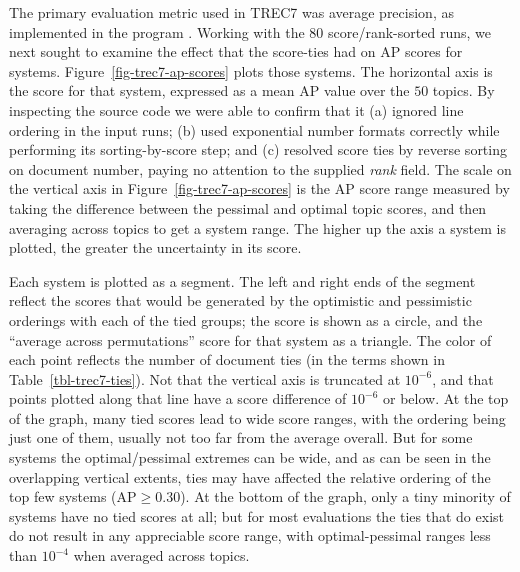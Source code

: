 The primary evaluation metric used in TREC7 was average precision, as
implemented in the program {\treceval}.
Working with the $80$ score/rank-sorted runs, we next sought to
examine the effect that the score-ties had on AP scores for systems.
Figure~\ref{fig-trec7-ap-scores} plots those systems.
The horizontal axis is the {\treceval} score for that system,
expressed as a mean AP value over the $50$ topics.
By inspecting the {\treceval} source code we were able to confirm
that it (a) ignored line ordering in the input runs; (b) used
exponential number formats correctly while performing its
sorting-by-score step; and (c) resolved score ties by reverse sorting
on document number, paying no attention to the supplied {\emph{rank}}
field.
The scale on the vertical axis in Figure~\ref{fig-trec7-ap-scores} is
the AP score range measured by taking the difference between the
pessimal and optimal topic scores, and then averaging across topics
to get a system range.
The higher up the axis a system is plotted, the greater the
uncertainty in its score.

Each system is plotted as a segment.
The left and right ends of the segment reflect the scores that would
be generated by the optimistic and pessimistic orderings with each of
the tied groups; the {\treceval} score is shown as a circle, and the
``average across permutations'' score for that system as a triangle.
The color of each point reflects the number of document ties (in the
terms shown in Table~\ref{tbl-trec7-ties}).
Not that the vertical axis is truncated at $10^{-6}$, and that points
plotted along that line have a score difference of $10^{-6}$ or
below.
At the top of the graph, many tied scores lead to wide score ranges,
with the {\treceval} ordering being just one of them, usually not too
far from the average overall.
But for some systems the optimal/pessimal extremes can be wide, and
as can be seen in the overlapping vertical extents, ties may have
affected the relative ordering of the top few systems ($\mbox{AP}\ge
0.30$).
At the bottom of the graph, only a tiny minority of systems have no
tied scores at all; but for most evaluations the ties that do exist
do not result in any appreciable score range, with optimal-pessimal
ranges less than $10^{-4}$ when averaged across topics.



{}
{}
{}
{}
